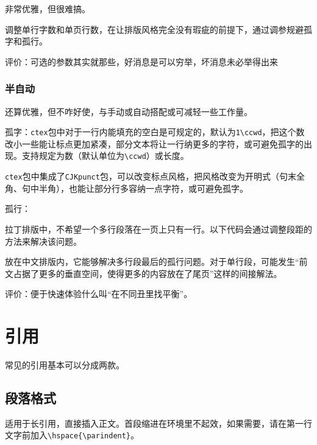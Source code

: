 \documentclass[10pt,openany]{book}
\begin{document}
\begin{sloppypar}
    非常优雅，但很难搞。

    调整单行字数和单页行数，在让排版风格完全没有瑕疵的前提下，通过调参规避孤字和孤行。

    评价：可选的参数其实就那些，好消息是可以穷举，坏消息未必举得出来

    \subsection{半自动}

    还算优雅，但不咋好使，与手动或自动搭配或可减轻一些工作量。

    孤字：\texttt{ctex}包中对于一行内能填充的空白是可规定的，默认为\texttt{1\textbackslash{}ccwd}，把这个数改小一些能让标点更加紧凑，部分文本将让一行纳更多的字符，或可避免孤字的出现。支持规定为数（默认单位为\texttt{\textbackslash{}ccwd}）或长度。

    

    \texttt{ctex}包中集成了\texttt{CJKpunct}包，可以改变标点风格，把风格改变为开明式（句末全角、句中半角），也能让部分行多容纳一点字符，或可避免孤字。

    

    孤行：

    拉丁排版中，不希望一个多行段落在一页上只有一行。以下代码会通过调整段距的方法来解决该问题。

    

    放在中文排版内，它能够解决多行段最后的孤行问题。对于单行段，可能发生“前文占据了更多的垂直空间，使得更多的内容放在了尾页”这样的间接解法。

    评价：便于快速体验什么叫“在不同丑里找平衡”。

    \chapter{引用}

    常见的引用基本可以分成两款。

    \section{段落格式}

    适用于长引用，直接插入正文。首段缩进在环境里不起效，如果需要，请在第一行文字前加入\texttt{\textbackslash{}hspace\{\textbackslash{}parindent\}}。


\end{sloppypar}
\end{document}
